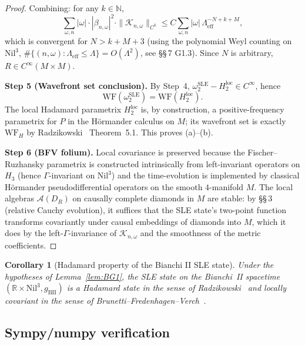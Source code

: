 \documentclass[11pt, a4paper]{article}
\newtheorem{corollary}[theorem]{Corollary}
\newcommand{\RR}{\mathbb{R}}
\newcommand{\NN}{\mathbb{N}}
\newcommand{\Hgroup}{H_3}
\newcommand{\Nil}{\mathrm{Nil}^3}
\newcommand{\WF}{\mathrm{WF}}
\newcommand{\om}{\omega}
\newcommand{\Lam}{\Lambda}
\begin{document}
\begin{proof}
Combining: for any $k\in\NN$,
\begin{equation}
  \sum_{\om,n}|\om|\cdot|\beta_{n,\om}|^2\cdot\|\mathcal K_{n,\om}\|_{C^k}
  \le C \sum_{\om,n}|\om|\,\Lam_{\mathrm{eff}}^{-N+k+M},
\end{equation}
which is convergent for $N>k+M+3$ (using the polynomial Weyl counting on
$\Nil$, $\#\{(n,\om):\Lam_{\mathrm{eff}}\le\Lam\}=O(\Lam^2)$, see
\cite{LemmaBG1} \S\S\,7 G1.3). Since $N$ is arbitrary, $R\in C^\infty(M\times M)$.

\textbf{Step 5 (Wavefront set conclusion).}
By Step~4, $\omega_2^{\mathrm{SLE}} - H_2^{\mathrm{loc}} \in C^\infty$, hence
\begin{equation}\label{eq:WF_eq}
  \WF(\omega_2^{\mathrm{SLE}}) = \WF(H_2^{\mathrm{loc}}).
\end{equation}
The local Hadamard parametrix $H_2^{\mathrm{loc}}$ is, by construction,
a positive-frequency parametrix for $P$ in the Hörmander calculus on $M$;
its wavefront set is exactly $\WF_H$ by Radzikowski~\cite{Rad96} Theorem~5.1.
This proves (a)–(b).

\textbf{Step 6 (BFV folium).}
Local covariance is preserved because the Fischer--Ruzhansky parametrix is
constructed intrinsically from left-invariant operators on $\Hgroup$ (hence
$\Gamma$-invariant on $\Nil$) and the time-evolution is implemented by
classical Hörmander pseudodifferential operators on the smooth $4$-manifold
$M$. The local algebras $\mathcal A(D_R)$ on causally complete diamonds in
$M$ are stable: by \cite{BFV03} \S\S\,3 (relative Cauchy evolution), it
suffices that the SLE state's two-point function transforms covariantly
under causal embeddings of diamonds into $M$, which it does by the
left-$\Gamma$-invariance of $\mathcal K_{n,\om}$ and the smoothness of the
metric coefficients.
\end{proof}

\begin{corollary}[Hadamard property of the Bianchi II SLE state]\label{cor:Hadamard}
Under the hypotheses of Lemma~\ref{lem:BG1}, the SLE state on the Bianchi~II
spacetime $(\RR\times\Nil, g_{\mathrm{BII}})$ is a Hadamard state in the
sense of Radzikowski~\cite{Rad96} and locally covariant in the sense of
Brunetti--Fredenhagen--Verch~\cite{BFV03}.
\end{corollary}

\subsection{Sympy/numpy verification}\label{sec:sympy_FR}
\end{document}
